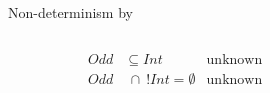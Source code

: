 



\begin{frame}{Non-determinism by }
  \begin{columns}[T]
    \begin{column}{0.35\textwidth}
      \centering
      \begin{align*}
        Odd&\subseteq Int &\text{unknown}\\
        Odd&~\cap~ !Int = \emptyset &\text{unknown}
      \end{align*}
      \scalebox{1.0}{}%
    \end{column}%
    \begin{column}{0.7\textwidth}
    \end{column}
  \end{columns}
\end{frame}








\newsavebox\classbox
\begin{lrbox}{\classbox}
  \begin{minipage}{5cm}
    
  \end{minipage}
\end{lrbox}

